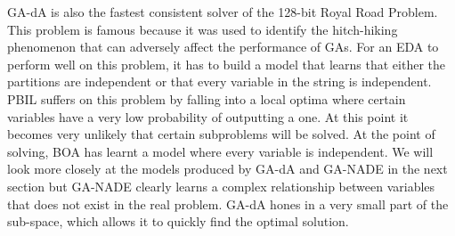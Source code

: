 \documentclass[twoside]{article}
\begin{document}
GA-dA is also the fastest consistent solver of the 128-bit Royal Road Problem. This problem is famous because it was used to identify the hitch-hiking phenomenon that can adversely affect the performance of GAs. For an EDA to perform well on this problem, it has to build a model that learns that either the partitions are independent or that every variable in the string is independent. PBIL suffers on this problem by falling into a local optima where certain variables have a very low probability of outputting a one. At this point it becomes very unlikely that certain subproblems will be solved. At the point of solving, BOA has learnt a model where every variable is independent. We will look more closely at the models produced by GA-dA and GA-NADE in the next section but GA-NADE clearly learns a complex relationship between variables that does not exist in the real problem. GA-dA hones in a very small part of the sub-space, which allows it to quickly find the optimal solution.
%
\end{document}
